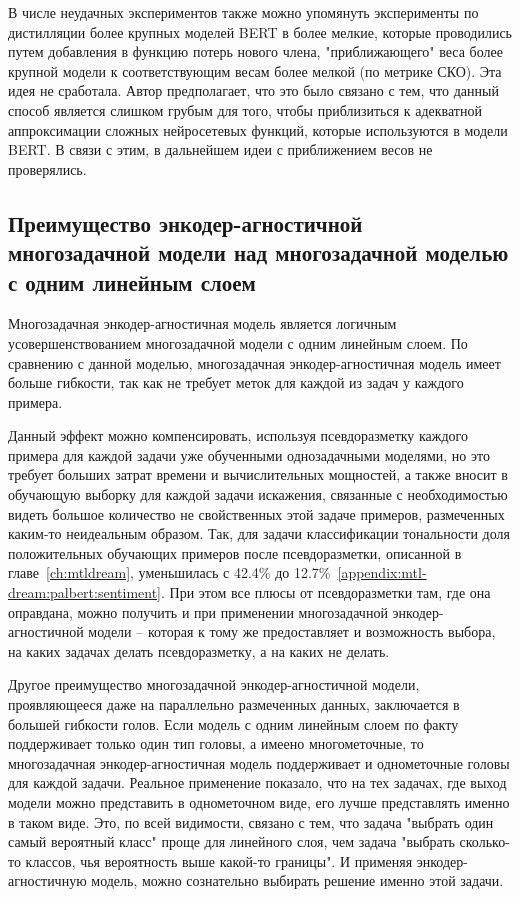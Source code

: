 В числе неудачных экспериментов также можно упомянуть эксперименты по дистилляции более крупных моделей BERT в более мелкие, которые проводились путем добавления в функцию потерь нового члена, "приближающего" веса более крупной модели к соответствующим весам более мелкой (по метрике СКО). Эта идея не сработала. Автор предполагает, что это было связано с тем, что данный способ является слишком грубым для того, чтобы приблизиться к адекватной аппроксимации сложных нейросетевых функций, которые используются в модели BERT. В связи с этим, в дальнейшем идеи с приближением весов не проверялись. 
\subsection{Преимущество энкодер-агностичной многозадачной модели над многозадачной моделью с одним линейным слоем}
\label{ch:tr-ag:advantages}

Многозадачная энкодер-агностичная модель является логичным усовершенствованием многозадачной модели с одним линейным слоем. По сравнению с данной моделью, многозадачная энкодер-агностичная модель имеет больше гибкости, так как не требует меток для каждой из задач у каждого примера. %

Данный эффект можно компенсировать, используя псевдоразметку каждого примера для каждой задачи уже обученными однозадачными моделями, но это требует больших затрат времени и вычислительных мощностей, а также вносит в обучающую выборку для каждой задачи искажения, связанные с необходимостью видеть большое количество не свойственных этой задаче примеров, размеченных каким-то неидеальным образом. Так, для задачи классификации тональности доля положительных обучающих примеров после псевдоразметки, описанной в главе~\ref{ch:mtldream}, уменьшилась с 42.4\% до 12.7\%~\ref{appendix:mtl-dream:palbert:sentiment}. При этом все плюсы от псевдоразметки там, где она оправдана, можно получить и при применении многозадачной энкодер-агностичной модели -- которая к тому же предоставляет и возможность выбора, на каких задачах делать псевдоразметку, а на каких не делать.

Другое преимущество многозадачной энкодер-агностичной модели, проявляющееся даже на параллельно размеченных данных, заключается в большей гибкости голов. Если модель с одним линейным слоем по факту поддерживает только один тип головы, а имеено многометочные, то многозадачная энкодер-агностичная модель поддерживает и однометочные головы для каждой задачи. Реальное применение показало, что на тех задачах, где выход модели можно представить в однометочном виде, его лучше представлять именно  в таком виде. Это, по всей видимости, связано с тем, что задача "выбрать один самый вероятный класс" проще для линейного слоя, чем задача "выбрать сколько-то классов, чья вероятность выше какой-то границы". И применяя энкодер-агностичную модель, можно сознательно выбирать решение именно этой задачи.

